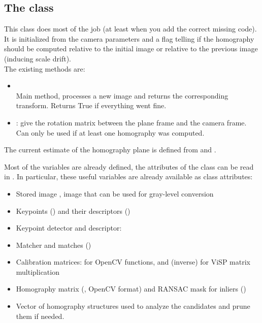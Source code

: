 \documentclass{ecnreport}
\begin{document}
\subsection{The  class}

This class does most of the job (at least when you add the correct missing code). It is initialized from the camera parameters and a flag telling if the homography
should be computed relative to the initial image or relative to the previous image (inducing scale drift).\\
The existing methods are:
\begin{itemize}
 \item {} \\ 
 Main method, processes a new image and returns the corresponding transform. Returns True if everything went fine. 
 \item {}: give the rotation matrix between the plane frame and the camera frame. Can only be used
 if at least one homography was computed.
\end{itemize}
The current estimate of the homography plane is defined from  and .

Most of the variables are already defined, the attributes of the class can be read in . In particular, 
these useful variables are already available as class attributes:
\begin{itemize}
\item Stored image , image that can be used for gray-level conversion 
 \item Keypoints () and their descriptors ()
 \item Keypoint detector and descriptor: 
 \item Matcher and matches ()
 \item Calibration matrices:  for OpenCV functions,  and  (inverse) for ViSP matrix multiplication
 \item Homography matrix (, OpenCV format) and RANSAC mask for inliers ()
 \item Vector of homography structures  used to analyze the candidates and prune them if needed.
\end{itemize}
\end{document}
